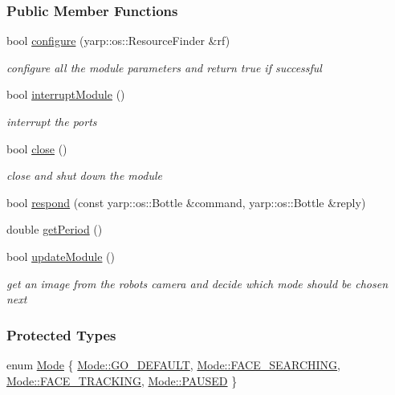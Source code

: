 \subsubsection*{Public Member Functions}
\begin{DoxyCompactItemize}
\item 
bool \hyperlink{group__faceTracker_af986fddb3c617499c93b0eff039df1a9}{configure} (yarp\+::os\+::\+Resource\+Finder \&rf)
\begin{DoxyCompactList}\small\item\em configure all the module parameters and return true if successful \end{DoxyCompactList}\item 
bool \hyperlink{group__faceTracker_ac025eb44b288916aa000917be21d4cb1}{interrupt\+Module} ()
\begin{DoxyCompactList}\small\item\em interrupt the ports \end{DoxyCompactList}\item 
bool \hyperlink{group__faceTracker_aef55caa650c48bdd6695194a5f3f3f9d}{close} ()
\begin{DoxyCompactList}\small\item\em close and shut down the module \end{DoxyCompactList}\item 
bool \hyperlink{group__faceTracker_a79c16b996d3ea3492323897544085f0a}{respond} (const yarp\+::os\+::\+Bottle \&command, yarp\+::os\+::\+Bottle \&reply)
\item 
double \hyperlink{group__faceTracker_a249d0a6adc301a5a1637da1eb79a29c9}{get\+Period} ()
\item 
bool \hyperlink{group__faceTracker_a3b4f7abdfcc1c9661c8e8b06d6454bcc}{update\+Module} ()
\begin{DoxyCompactList}\small\item\em get an image from the robot\textquotesingle{}s camera and decide which mode should be chosen next \end{DoxyCompactList}\end{DoxyCompactItemize}
\subsubsection*{Protected Types}
\begin{DoxyCompactItemize}
\item 
enum \hyperlink{group__faceTracker_ac6632cfbb140765f8c5cc507e82b3ec7}{Mode} \{ \newline
\hyperlink{group__faceTracker_ac6632cfbb140765f8c5cc507e82b3ec7a9f04867dada5f91521c952b43aceb2bb}{Mode\+::\+G\+O\+\_\+\+D\+E\+F\+A\+U\+LT}, 
\newline
\hyperlink{group__faceTracker_ac6632cfbb140765f8c5cc507e82b3ec7ae6ad6d5a7508481788415802c33cd070}{Mode\+::\+F\+A\+C\+E\+\_\+\+S\+E\+A\+R\+C\+H\+I\+NG}, 
\newline
\hyperlink{group__faceTracker_ac6632cfbb140765f8c5cc507e82b3ec7ac31c9352685fa90547a6abd2d1f30a60}{Mode\+::\+F\+A\+C\+E\+\_\+\+T\+R\+A\+C\+K\+I\+NG}, 
\newline
\hyperlink{group__faceTracker_ac6632cfbb140765f8c5cc507e82b3ec7a99b2439e63f73ad515f7ab2447a80673}{Mode\+::\+P\+A\+U\+S\+ED}
 \}
\end{DoxyCompactItemize}
